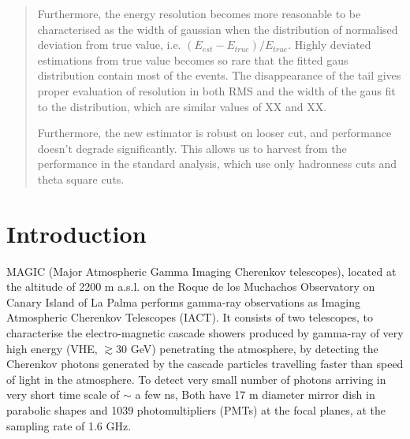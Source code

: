 \documentclass[preprint,12pt,authoryear]{elsarticle}
\begin{document}
\begin{frontmatter}
\begin{abstract}
Furthermore, the energy resolution becomes more reasonable to be characterised as the width of gaussian when the distribution of normalised deviation from true value, i.e. $(E_{est} - E_{true})/E_{true}$. Highly deviated estimations from true value becomes so rare that the fitted gaus distribution contain most of the events. The disappearance of the tail gives proper evaluation of resolution in both RMS  and the width of the gaus fit to the distribution, which are similar values of  XX and XX.


Furthermore,  the new estimator is robust on looser cut, and performance doesn't degrade significantly.  This allows us to harvest from the performance in the standard analysis, which use only hadronness cuts and theta square cuts.


\end{abstract}

\begin{keyword}



\end{keyword}

\end{frontmatter}


\section{Introduction}
MAGIC (Major Atmospheric Gamma Imaging Cherenkov telescopes), located at the altitude of 2200 m a.s.l. on the Roque de los Muchachos Observatory on Canary Island of La Palma performs gamma-ray observations as Imaging Atmospheric Cherenkov Telescopes (IACT).
It consists of two telescopes, to characterise the electro-magnetic cascade showers produced by gamma-ray of very high energy (VHE, $\gtrsim 30$ GeV) penetrating the atmosphere, by detecting the Cherenkov photons generated by the cascade particles travelling faster than speed of light in the atmosphere.
To detect very small number of photons arriving in very short time scale of $\sim $ a few ns, Both have 17 m diameter mirror dish in parabolic shapes and 1039 photomultipliers (PMTs) at the focal planes, at the sampling rate of 1.6 GHz.
\end{document}

